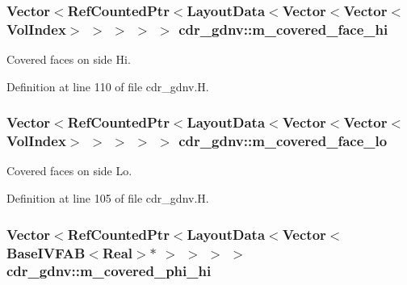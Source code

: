 \subsubsection[{\texorpdfstring{m\+\_\+covered\+\_\+face\+\_\+hi}{m_covered_face_hi}}]{\setlength{\rightskip}{0pt plus 5cm}Vector$<$Ref\+Counted\+Ptr$<$Layout\+Data$<$Vector$<$Vector$<$Vol\+Index$>$ $>$ $>$ $>$ $>$ cdr\+\_\+gdnv\+::m\+\_\+covered\+\_\+face\+\_\+hi\hspace{0.3cm}{\ttfamily [protected]}}\hypertarget{classcdr__gdnv_ab8e1a335582c15a0914ab0fde973659e}{}\label{classcdr__gdnv_ab8e1a335582c15a0914ab0fde973659e}


Covered faces on side Hi. 



Definition at line 110 of file cdr\+\_\+gdnv.\+H.

\subsubsection[{\texorpdfstring{m\+\_\+covered\+\_\+face\+\_\+lo}{m_covered_face_lo}}]{\setlength{\rightskip}{0pt plus 5cm}Vector$<$Ref\+Counted\+Ptr$<$Layout\+Data$<$Vector$<$Vector$<$Vol\+Index$>$ $>$ $>$ $>$ $>$ cdr\+\_\+gdnv\+::m\+\_\+covered\+\_\+face\+\_\+lo\hspace{0.3cm}{\ttfamily [protected]}}\hypertarget{classcdr__gdnv_a527bf07c01ec86d8c70236f41d034877}{}\label{classcdr__gdnv_a527bf07c01ec86d8c70236f41d034877}


Covered faces on side Lo. 



Definition at line 105 of file cdr\+\_\+gdnv.\+H.

\subsubsection[{\texorpdfstring{m\+\_\+covered\+\_\+phi\+\_\+hi}{m_covered_phi_hi}}]{\setlength{\rightskip}{0pt plus 5cm}Vector$<$Ref\+Counted\+Ptr$<$Layout\+Data$<$Vector$<$Base\+I\+V\+F\+AB$<$Real$>$$\ast$ $>$ $>$ $>$ $>$ cdr\+\_\+gdnv\+::m\+\_\+covered\+\_\+phi\+\_\+hi\hspace{0.3cm}{\ttfamily [protected]}}\hypertarget{classcdr__gdnv_ad353062c90baecdb6f33dbbff3828c5b}{}\label{classcdr__gdnv_ad353062c90baecdb6f33dbbff3828c5b}


